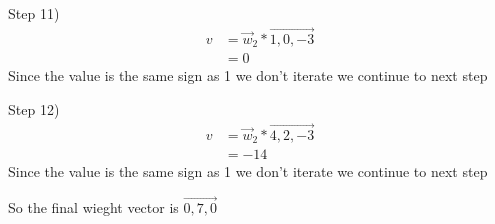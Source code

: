 \documentclass[12pt,english]{article}
\begin{document}
Step 11)
\begin{equation*}
\begin{split}
v&= \vec{w}_2* \vec{1,0,-3}\\
&= 0
\end{split}
\end{equation*}
Since the value is the same sign as 1 we don't iterate we continue to next step\par

Step 12)
\begin{equation*}
\begin{split}
v&= \vec{w}_2* \vec{4,2,-3}\\
&= -14
\end{split}
\end{equation*}
Since the value is the same sign as 1 we don't iterate we continue to next step\par
So the final wieght vector is $\vec{0,7,0}$
\end{document}
